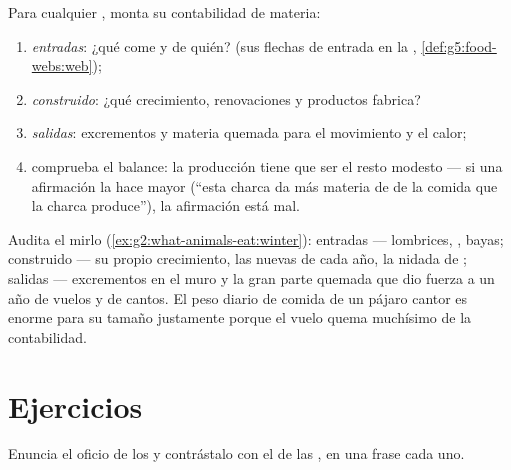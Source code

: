 \begin{method}\label{met:g6:matter-from-food:audit}
Para cualquier , monta su contabilidad de materia:
\begin{enumerate}
  \item \emph{entradas}: ¿qué  come y de quién? (sus
        flechas de entrada en la ,
        \cref{def:g5:food-webs:web});
  \item \emph{construido}: ¿qué crecimiento, renovaciones y productos
        fabrica?
  \item \emph{salidas}: excrementos y materia quemada para el
        movimiento y el calor;
  \item comprueba el balance: la producción tiene que ser el resto
        modesto --- si una afirmación la hace mayor (``esta charca da
        más materia de  de la comida que la charca produce''), la
        afirmación está mal.
\end{enumerate}
\end{method}

\begin{example}\label{ex:g6:matter-from-food:audituse}
Audita el mirlo (\cref{ex:g2:what-animals-eat:winter}): entradas ---
lombrices, , bayas; construido --- su propio crecimiento, las
 nuevas de cada año, la nidada de ; salidas --- excrementos
en el muro y la gran parte quemada que dio fuerza a un año de vuelos y
de cantos. El peso diario de comida de un pájaro cantor es enorme para
su tamaño justamente porque el vuelo quema muchísimo de la contabilidad.
\end{example}

\section{Ejercicios}

\begin{exercise}[$\star$]\label{exo:g6:matter-from-food:1}
Enuncia el oficio de los  y contrástalo con el de las
, en una frase cada uno.
\end{exercise}

